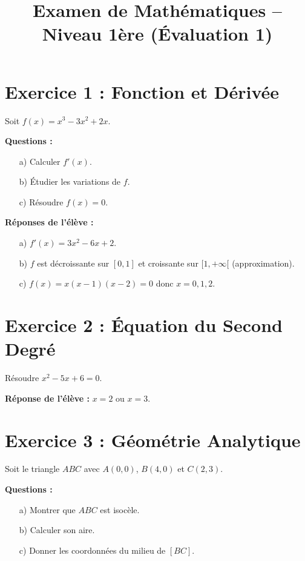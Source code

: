 \documentclass{article}
\begin{document}
\title{Examen de Mathématiques – Niveau 1ère (Évaluation 1)}
\date{}
\maketitle

\section*{Exercice 1 : Fonction et Dérivée}
Soit \( f(x) = x^3 - 3x^2 + 2x \).

\textbf{Questions :}
\begin{enumerate}
    \item[a)] Calculer \( f'(x) \).
    \item[b)] Étudier les variations de \( f \).
    \item[c)] Résoudre \( f(x) = 0 \).
\end{enumerate}

\textbf{Réponses de l’élève :}
\begin{enumerate}
    \item[a)] \( f'(x) = 3x^2 - 6x + 2 \).
    \item[b)] \( f \) est décroissante sur \( [0,1] \) et croissante sur \( [1,+\infty[ \) (approximation).
    \item[c)] \( f(x) = x(x-1)(x-2) = 0 \) donc \( x = 0, 1, 2 \).
\end{enumerate}

\section*{Exercice 2 : Équation du Second Degré}
Résoudre \( x^2 - 5x + 6 = 0 \).

\textbf{Réponse de l’élève :}
\( x = 2 \) ou \( x = 3 \).

\section*{Exercice 3 : Géométrie Analytique}
Soit le triangle \( ABC \) avec \( A(0,0) \), \( B(4,0) \) et \( C(2,3) \).

\textbf{Questions :}
\begin{enumerate}
    \item[a)] Montrer que \( ABC \) est isocèle.
    \item[b)] Calculer son aire.
    \item[c)] Donner les coordonnées du milieu de \( [BC] \).
\end{enumerate}
\end{document}
